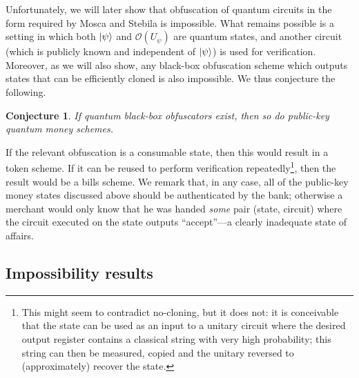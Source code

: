 \documentclass[11pt]{article}
\numberwithin{equation}{section}
\newtheorem{conjecture}{Conjecture}
\begin{document}
{Unfortunately, we will later show that obfuscation of quantum circuits in the form required by Mosca and Stebila is impossible. What remains possible is a setting in which both ${\left\vert{\psi}\right\rangle}$ and $\mathcal O(U_\psi)$ are quantum states, and another circuit (which is publicly known and independent of ${\left\vert{\psi}\right\rangle}$) is used for verification. Moreover, as we will also show, any black-box obfuscation scheme which outputs states that can be efficiently cloned is also impossible. We thus conjecture the following.
\begin{conjecture}
If quantum black-box obfuscators exist, then so do public-key quantum money schemes.
\end{conjecture}
If the relevant obfuscation is a consumable state, then this would result in a token scheme. If it can be reused to perform verification repeatedly\footnote{This might seem to contradict no-cloning, but it does not: it is conceivable that the state can be used as an input to a unitary circuit where the desired output register contains a classical string with very high probability; this string can then be measured, copied and the unitary reversed to (approximately) recover the state.}, then the result would be a bills scheme. We remark that, in any case, all of the public-key money states discussed above should be authenticated by the bank; otherwise a merchant would only know that he was handed \emph{some} pair (state, circuit) where the circuit executed on the state outputs ``accept''---a clearly inadequate state of affairs.

\subsection{Impossibility results}\label{vbb:impossibility}

}
\end{document}
